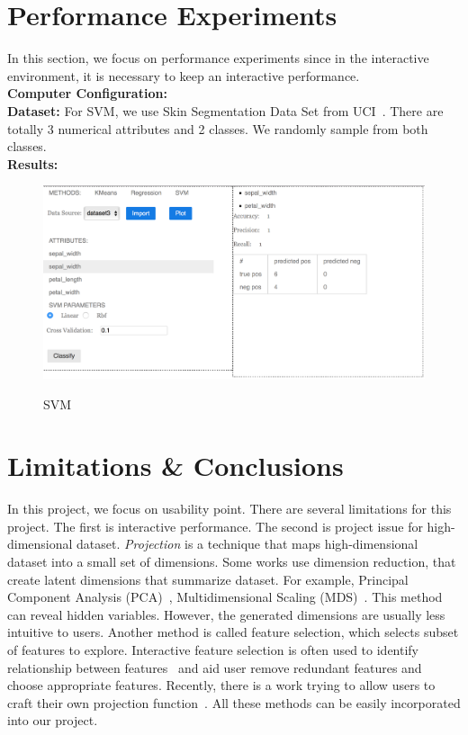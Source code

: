 \documentclass{article}
\begin{document}
\section{Performance Experiments}
In this section, we focus on performance experiments since in the interactive environment, it is necessary to keep an interactive performance. \\
\textbf{Computer Configuration:} \\
\textbf{Dataset:} For SVM, we use Skin Segmentation Data Set from UCI~\cite{skinsegment}.  There are totally 3 numerical attributes and 2 classes. We randomly sample from both classes. \\
\textbf{Results:} \\
\begin{figure}[h]
	\includegraphics[width=\textwidth]{figs/svm}
	\label{fig:svm}
	\caption{SVM}
\end{figure} 

\section{Limitations \& Conclusions}
In this project, we focus on usability point. There are several limitations for this project. The first is interactive performance. The second is project issue for high-dimensional dataset. \emph{Projection} is a technique that maps high-dimensional dataset into a small set of dimensions. Some works use dimension reduction, that create latent dimensions that summarize dataset. For example, Principal Component Analysis (PCA)~\cite{jolliffe2002principal}, Multidimensional Scaling (MDS)~\cite{mead1992review}. This method can reveal hidden variables. However, the generated dimensions are usually less intuitive to users. Another method is called feature selection, which selects subset of features to explore. Interactive feature selection is often used to identify relationship between features~\cite{guo2003coordinating, yang2004value} and aid user remove redundant features and choose appropriate features. Recently, there is a work trying to allow users to craft their own projection function~\cite{gleicher2013explainers}.  All these methods can be easily incorporated into our project.  \\



\end{document}
